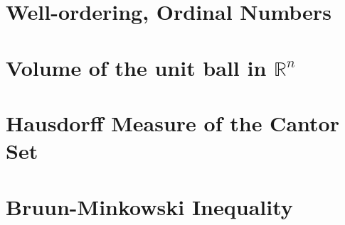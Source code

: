 \documentclass[11pt]{book}
\theoremstyle{definition}
\numberwithin{equation}{chapter}
\begin{document}
%






\begin{appendices}
\chapter{Well-ordering, Ordinal Numbers}\label{appendix_a}



\chapter{Volume of the unit ball in $\mathbb{R}^n$}\label{appendix_b}



\chapter{Hausdorff Measure of the Cantor Set}\label{appendix_c}



\chapter{Bruun-Minkowski Inequality}\label{appendix_d}




\end{appendices}

\newpage


\end{document}
